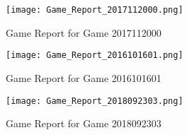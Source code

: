 \documentclass [a4paper,12pt] {article}
\begin{document}
    \begin{figure}
        \texttt{[image: Game\_Report\_2017112000.png]}
        \caption{Game Report for Game 2017112000}
        \label{fig:game2017112000}
    \end{figure} 

    \begin{figure}
        \texttt{[image: Game\_Report\_2016101601.png]}
        \caption{Game Report for Game 2016101601}
        \label{fig:game2016101601}
    \end{figure} 

    \begin{figure}
        \texttt{[image: Game\_Report\_2018092303.png]}
        \caption{Game Report for Game 2018092303}
        \label{fig:game2018092303}
    \end{figure} 
\end{document}

